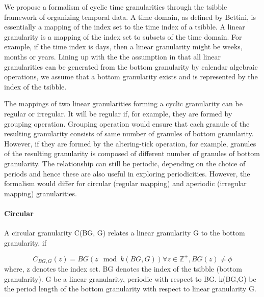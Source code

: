 \documentclass[12pt]{article}
\begin{document}
We propose a formalism of cyclic time granularities through the tsibble
\citep{wang2019tsibble} framework of organizing temporal data. A time
domain, as defined by Bettini, is essentially a mapping of the index set
to the time index of a tsibble. A linear granularity is a mapping of the
index set to subsets of the time domain. For example, if the time index
is days, then a linear granularity might be weeks, months or years.
Lining up with the the assumption in \citep{Bettini2000-vy} that all
linear granularities can be generated from the bottom granularity by
calendar algebraic operations, we assume that a bottom granularity
exists and is represented by the index of the tsibble.

The mappings of two linear granularities forming a cyclic granularity
can be regular or irregular. It will be regular if, for example, they
are formed by grouping operation. Grouping operation would ensure that
each granule of the resulting granularity consists of same number of
granules of bottom granularity. However, if they are formed by the
altering-tick operation, for example, granules of the resulting
granularity is composed of different number of granules of bottom
granularity. The relationship can still be periodic, depending on the
choice of periods and hence these are also useful in exploring
periodicities. However, the formalism would differ for circular (regular
mapping) and aperiodic (irregular mapping) granularities.

\hypertarget{sec:circular-gran-def}{%
\paragraph{Circular}\label{sec:circular-gran-def}}

\begin{timedom}\label{def:circular}
A circular granularity C(BG, G) relates a linear granularity G to the bottom granularity, if

\begin{equation} \label{eq:eq2}
C_{BG, G}(z) = BG(z\mod k(BG,G)) \forall z \in \mathbb{Z}^+,
BG(z) \neq \phi
\end{equation}
where,  
z denotes the index set.  
BG denotes the index of the tsibble (bottom granularity).  
G be a linear granularity, periodic with respect to BG.    
k(BG,G) be the period length of the bottom granularity with respect to linear granularity G.  
\end{timedom}
\end{document}
